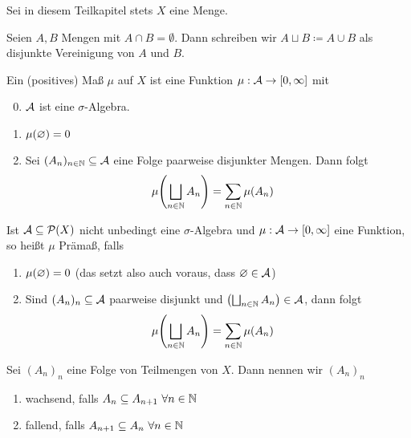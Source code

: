 \begin{mdframed}
    \centering
    Sei in diesem Teilkapitel stets $X$ eine Menge.
\end{mdframed}

\begin{notation}
    \marginnote{[25. Okt]}
    Seien $A,B$ Mengen mit $A\cap B = \emptyset$. Dann schreiben wir $A \sqcup B \coloneqq A \cup B$ als disjunkte Vereinigung von $A$ und $B$.
\end{notation}

\begin{definition}[Maß]
    Ein (positives) Maß $\mu$ auf $X$ ist eine Funktion $\mu: \mathcal{A} \to\left[0,\infty\right]$ mit
    \begin{enumerate}[label=($\text{M}_{\arabic*}$)]
        \setcounter{enumi}{-1}
        \item $\mathcal{A}$ ist eine $\sigma$-Algebra.
        \item $\mu\of{\emptyset} = 0$
        \item Sei $(A_n)_{n\in\mathbb{N}}\subseteq\mathcal{A}$ eine Folge paarweise disjunkter Mengen. Dann folgt
        \begin{align*}
            \mu\of{\bigsqcup_{n\in\N} A_n} &= \sum_{n\in\N}^{} \mu\of{A_n}
        \end{align*}
    \end{enumerate}
\end{definition}

\begin{definition}[Prämaß]
    Ist $\mA\subseteq\mathcal{P}\of{X}$ nicht unbedingt eine $\sigma$-Algebra und $\mu: \mathcal{A}\to\left[0,\infty\right]$ eine Funktion, so heißt $\mu$ Prämaß, falls
    \begin{enumerate}[label=($\text{PM}_{\arabic*}$)]
        \item $\mu\of{\emptyset} = 0$ (das setzt also auch voraus, dass $\varnothing\in\mathcal{A}$)
        \item Sind $(A_n)_{n}\subseteq\mathcal{A}$ paarweise disjunkt und $\left(\bigsqcup_{n\in\mathbb{N}} A_n\right)\in\mathcal{A}$, dann folgt
        \begin{align*}
            \mu\of{\bigsqcup_{n\in\N} A_n} &= \sum_{n\in\N}^{} \mu\of{A_n}
        \end{align*}
    \end{enumerate}
\end{definition}

\begin{definition}
    Sei $(A_n)_n$ eine Folge von Teilmengen von $X$. Dann nennen wir $(A_n)_n$
    \begin{enumerate}[label=-]
        \item wachsend, falls $A_n \subseteq A_{n+1}~\forall n\in\mathbb{N}$
        \item fallend, falls $A_{n+1} \subseteq A_{n}~\forall n\in\mathbb{N}$
    \end{enumerate}
\end{definition}

